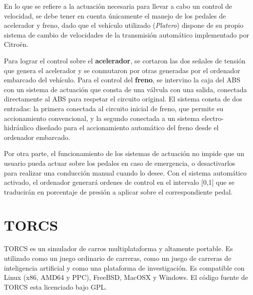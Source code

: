 En lo que se refiere a la actuación necesaria para llevar a cabo un control de velocidad, se debe tener en cuenta únicamente el manejo de los pedales de acelerador y freno, dado que el vehículo utilizado (\textit{Platero}) dispone de su propio sistema de cambio de velocidades de la transmisión automático implementado por Citroën.

Para lograr el control sobre el \textbf{acelerador}, se cortaron las dos señales de tensión que genera el acelerador y se conmutaron por otras generadas por el ordenador embarcado del vehículo. Para el control del \textbf{freno}, se intervino la caja del \gls{ABS} con un sistema de actuación que consta de una válvula con una salida, conectada directamente al \gls{ABS} para respetar el circuito original. El sistema consta de dos entradas: la primera conectada al circuito inicial de freno, que permite su accionamiento convencional, y la segundo conectada a un sistema electro-hidráulico diseñado para el accionamiento automático del freno desde el ordenador embarcado.

Por otra parte, el funcionamiento de los sistemas de actuación no impide que un usuario pueda actuar sobre los pedales en caso de emergencia, o desactivarlos para realizar una conducción manual cuando lo desee. Con el sistema automático activado, el ordenador generará ordenes de control en el intervalo [0,1] que se traducirán en porcentaje de presión a aplicar sobre el correspondiente pedal.

\section{TORCS}
\label{sec:torcs}

\gls{TORCS} es un simulador de carros multiplataforma y altamente portable. Es utilizado como un juego ordinario de carreras, como un juego de carreras de inteligencia artificial y como una plataforma de investigación. Es compatible con \gls{Linux} (\gls{x86}, \gls{AMD64} y \gls{PPC}), \gls{FreeBSD}, \gls{MacOSX} y \gls{Windows}. El código fuente de TORCS esta licenciado bajo \gls{GPL}.

